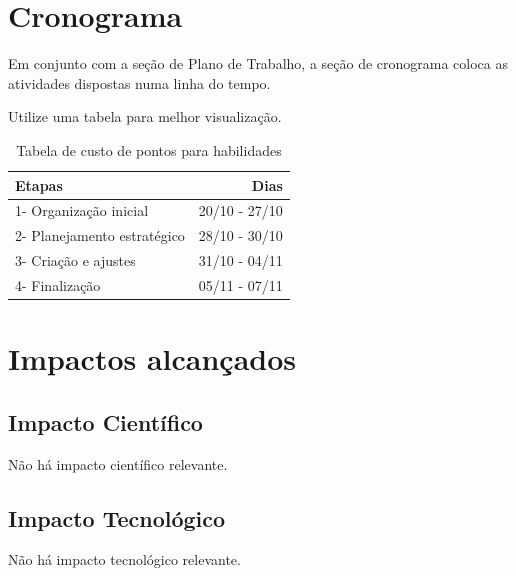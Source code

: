 \documentclass[a4paper,10pt]{article}  %
\begin{document}
\section{Cronograma}

   Em conjunto com a seção de Plano de Trabalho, a seção de cronograma coloca as atividades dispostas numa linha do tempo.


   Utilize uma tabela para melhor visualização.

\begin{table}[H]
\begin{center}
 \caption{Tabela de custo de pontos para habilidades}
\begin{tabular}{|l|r|}
  \hline \hline
  Etapas & Dias  \\ \hline 
  1- Organização inicial &  20/10 - 27/10  \\ \hline
  2- Planejamento estratégico & 28/10 - 30/10 \\ \hline
  3- Criação e ajustes  &  31/10 - 04/11 \\ \hline
  4- Finalização & 05/11 - 07/11 \\ \hline
\end{tabular} 
\end{center}
\end{table}


\section{Impactos alcançados } %

 \subsection{Impacto Científico}

 Não há impacto científico relevante.

 \subsection{Impacto Tecnológico}

  Não há impacto tecnológico relevante.
\end{document}
